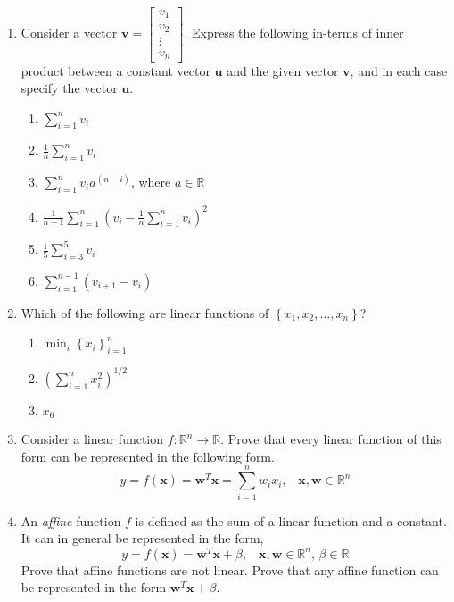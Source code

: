 \documentclass[9pt]{article}
\begin{document}
\begin{multicols}{2}
\begin{enumerate}
      \item Consider a vector $\mathbf{v} = \begin{bmatrix*}v_1\\v_2\\\vdots\\v_n\end{bmatrix*}$. Express the following in-terms of inner product between a constant vector $\mathbf{u}$ and the given vector $\mathbf{v}$, and in each case specify the vector $\mathbf{u}$.
      \begin{enumerate}
          \item $\sum_{i=1}^nv_i$
          \item $\frac{1}{n}\sum_{i=1}^nv_i$
          \item $\sum_{i=1}^nv_ia^{\left(n - i\right)}$, where $a \in \mathbb{R}$
          \item $\frac{1}{n-1}\sum_{i=1}^n\left(v_i - \frac{1}{n}\sum_{i=1}^nv_i \right)^2$
          \item $\frac{1}{5}\sum_{i=3}^5 v_i$
          \item $\sum_{i=1}^{n-1} \left(v_{i+1} - v_i\right)$
      \end{enumerate}
      
      \item Which of the following are linear functions of $\left\{x_1, x_2, \ldots,x_n\right\}$?
      \begin{enumerate}
          \item $\min_i \left\{x_i\right\}_{i=1}^{n}$
          \item $\left(\sum_{i=1}^n x_i^2\right)^{1/2}$
          \item $x_6$
      \end{enumerate}
      
      \item Consider a linear function $f: \mathbb{R}^n \rightarrow \mathbb{R}$. Prove that every linear function of this form can be represented in the following form.
      \[ y = f\left(\mathbf{x}\right) = \mathbf{w}^T\mathbf{x} = \sum_{i=1}^{n}w_ix_i, \,\,\,\,\, \mathbf{x}, \mathbf{w} \in \mathbb{R}^n \]
  
      \item An \textit{affine} function $f$ is defined as the sum of a linear function and a constant. It can in general be represented in the form, 
      \[ y = f\left(\mathbf{x}\right) = \mathbf{w}^T\mathbf{x} + \beta, \,\,\,\,\, \mathbf{x}, \mathbf{w} \in \mathbb{R}^n, \, \beta \in \mathbb{R} \]
      Prove that affine functions are not linear. Prove that any affine function can be represented in the form $\mathbf{w}^T\mathbf{x} + \beta$.
  

\end{enumerate}
\end{multicols}
\end{document}
